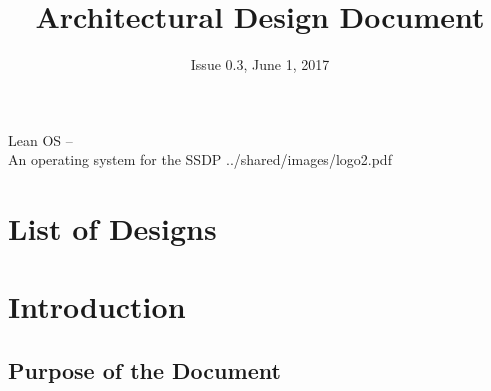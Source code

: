 

\title{Architectural Design Document}
\def \documentid {LEANOS-UVIE-ADD-001}
\date{Issue 0.3, June 1, 2017}

\newcommand\affil[1]{\textsuperscript#1}

\def\preparedby {Armin Luntzer\affil{1}}
\def\checkedby {Roland Ottensamer\affil{1}}
\def\approvedby {Franz Kerschbaum\affil{1}}

\def\affiliations{
	\affil{1} Department of Astrophysics, University of Vienna
}






\usepackage{vhistory}

\usepackage{biblatex}







\rereadauxdesignlabels





\setmainfont{MyriadPro-SemiCondensed}
\uvietitlepage%
{Lean OS --\\ An operating system for the SSDP}%
{\doctitle}%
{../shared/images/logo2.pdf}
\setmainfont{MyriadPro}

\approvalpage

\tableofcontents
\newpage


\chapter*{List of Designs}
\the\designlist


\begin{versionhistory}
\end{versionhistory}


\chapter{Introduction}

\section{Purpose of the Document}

